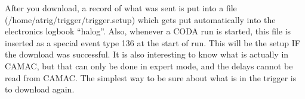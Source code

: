 {\par

After you download, a record of what was sent 
is put into a file (/home/atrig/trigger/trigger.setup) 
which gets put automatically into the electronics 
logbook ``halog''.   Also, whenever a CODA run is 
started, this file is inserted as a special event 
type 136 at the start of run.   This will be the 
setup IF the download was successful.   It is also 
interesting to know what is actually in CAMAC, but 
that can only be done in expert mode, and the delays
cannot be read from CAMAC.
The simplest way to be sure about what is in the 
trigger is to download again. 

}

%
%
%
%
